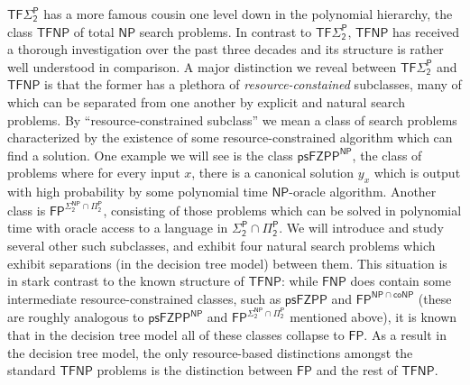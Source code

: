 \documentclass[11pt]{article}
\newcommand{\todo}[1]{\textcolor{red}{TODO: #1}}
\begin{document}
$\mathsf{TF\Sigma_2^P}$ has a more famous cousin one level down in the polynomial hierarchy, the class $\mathsf{TFNP}$ of total $\mathsf{NP}$ search problems. In contrast to $\mathsf{TF\Sigma_2^P}$, $\mathsf{TFNP}$ has received a thorough investigation over the past three decades and its structure is rather well understood in comparison. 
A major distinction we reveal between $\mathsf{TF\Sigma_2^P}$ and $\mathsf{TFNP}$ is that the former has a plethora of \emph{resource-constained} subclasses, many of which can be separated from one another by explicit and natural search problems. By ``resource-constrained subclass'' we mean a class of search problems characterized by the existence of some resource-constrained algorithm which can find a solution. One example we will see is the class $\mathsf{psFZPP^{NP}}$, the class of problems where for every input $x$, there is a canonical solution $y_x$ which is output with high probability by some polynomial time $\mathsf{NP}$-oracle algorithm. Another class is $\mathsf{FP^{\Sigma_2^{NP} \cap \Pi_2^P}}$, consisting of those problems which can be solved in polynomial time with oracle access to a language in $\mathsf{\Sigma_2^P \cap \Pi_2^P}$. We will introduce and study several other such subclasses, and exhibit four natural search problems which exhibit separations (in the decision tree model) between them. This situation is in stark contrast to the known structure of $\mathsf{TFNP}$: while $\mathsf{FNP}$ does contain some intermediate resource-constrained classes, such as $\mathsf{psFZPP}$ and $\mathsf{FP^{NP \cap coNP}}$ (these are roughly analogous to $\mathsf{psFZPP^{NP}}$ and $\mathsf{FP^{\Sigma_2^{NP} \cap \Pi_2^P}}$ mentioned above), it is known that in the decision tree model all of these classes collapse to $\mathsf{FP}$. As a result in the decision tree model, the only resource-based distinctions amongst the standard $\mathsf{TFNP}$ problems is the distinction between $\mathsf{FP}$ and the rest of $\mathsf{TFNP}$.

\end{document}
